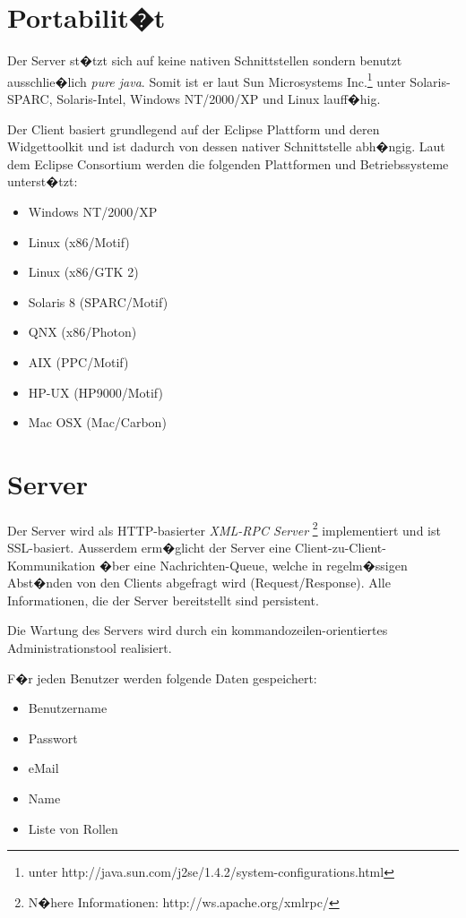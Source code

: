 \section{Portabilit�t}
Der Server st�tzt sich auf keine nativen Schnittstellen sondern benutzt ausschlie�lich 
\emph{pure java}. Somit ist er laut Sun Microsystems 
Inc.\footnote{unter http://java.sun.com/j2se/1.4.2/system-configurations.html} unter 
Solaris-SPARC, Solaris-Intel, Windows NT/2000/XP und Linux lauff�hig.

Der Client basiert grundlegend auf der Eclipse Plattform und deren Widgettoolkit und ist
dadurch von dessen nativer Schnittstelle abh�ngig. Laut dem Eclipse Consortium werden die folgenden 
Plattformen und Betriebssysteme unterst�tzt:
\begin{itemize}
    \item Windows NT/2000/XP
    \item Linux (x86/Motif)
    \item Linux (x86/GTK 2)
    \item Solaris 8 (SPARC/Motif)
    \item QNX (x86/Photon)
    \item AIX (PPC/Motif) 
    \item HP-UX (HP9000/Motif)
    \item Mac OSX (Mac/Carbon)
\end{itemize}


\section{Server}
Der Server wird als HTTP-basierter {\it XML-RPC Server}
\footnote{N�here Informationen: http://ws.apache.org/xmlrpc/}
implementiert und ist SSL-basiert. Ausserdem erm�glicht
der Server eine Client-zu-Client-Kommunikation �ber eine Nachrichten-Queue, welche
in regelm�ssigen Abst�nden von den Clients abgefragt wird (Request/Response).
Alle Informationen, die der Server bereitstellt sind persistent.\par
Die Wartung des Servers wird durch ein kommandozeilen-orientiertes
Administrationstool realisiert.\newline

F�r jeden Benutzer werden folgende Daten gespeichert:
\begin{itemize}
\item Benutzername
\item Passwort
\item eMail
\item Name
\item Liste von Rollen
\end{itemize}

